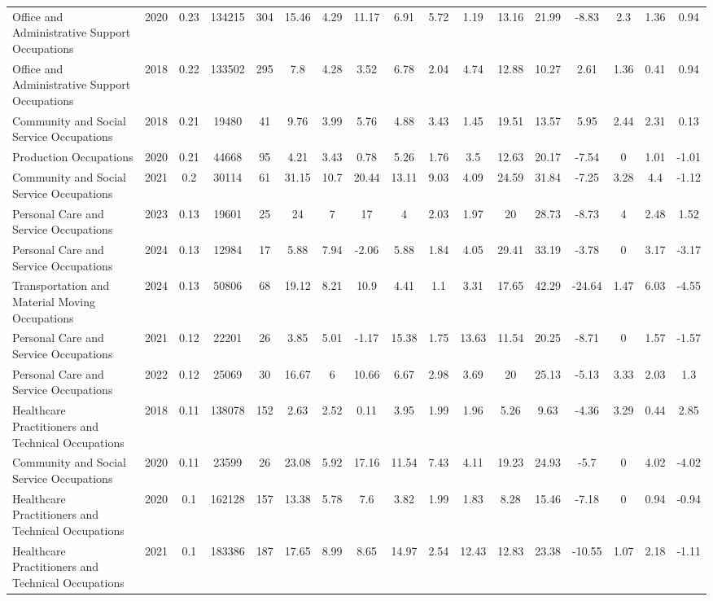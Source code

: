 \begin{landscape}
\begin{table}[htbp]
\begin{tabular}{lcccccccccccccccc}
Office and Administrative Support Occupations & 2020 & 0.23 & 134215 & 304 & 15.46 & 4.29 & 11.17 & 6.91 & 5.72 & 1.19 & 13.16 & 21.99 & -8.83 & 2.3 & 1.36 & 0.94 \\
Office and Administrative Support Occupations & 2018 & 0.22 & 133502 & 295 & 7.8 & 4.28 & 3.52 & 6.78 & 2.04 & 4.74 & 12.88 & 10.27 & 2.61 & 1.36 & 0.41 & 0.94 \\
Community and Social Service Occupations & 2018 & 0.21 & 19480 & 41 & 9.76 & 3.99 & 5.76 & 4.88 & 3.43 & 1.45 & 19.51 & 13.57 & 5.95 & 2.44 & 2.31 & 0.13 \\
Production Occupations & 2020 & 0.21 & 44668 & 95 & 4.21 & 3.43 & 0.78 & 5.26 & 1.76 & 3.5 & 12.63 & 20.17 & -7.54 & 0 & 1.01 & -1.01 \\
Community and Social Service Occupations & 2021 & 0.2 & 30114 & 61 & 31.15 & 10.7 & 20.44 & 13.11 & 9.03 & 4.09 & 24.59 & 31.84 & -7.25 & 3.28 & 4.4 & -1.12 \\
Personal Care and Service Occupations & 2023 & 0.13 & 19601 & 25 & 24 & 7 & 17 & 4 & 2.03 & 1.97 & 20 & 28.73 & -8.73 & 4 & 2.48 & 1.52 \\
Personal Care and Service Occupations & 2024 & 0.13 & 12984 & 17 & 5.88 & 7.94 & -2.06 & 5.88 & 1.84 & 4.05 & 29.41 & 33.19 & -3.78 & 0 & 3.17 & -3.17 \\
Transportation and Material Moving Occupations & 2024 & 0.13 & 50806 & 68 & 19.12 & 8.21 & 10.9 & 4.41 & 1.1 & 3.31 & 17.65 & 42.29 & -24.64 & 1.47 & 6.03 & -4.55 \\
Personal Care and Service Occupations & 2021 & 0.12 & 22201 & 26 & 3.85 & 5.01 & -1.17 & 15.38 & 1.75 & 13.63 & 11.54 & 20.25 & -8.71 & 0 & 1.57 & -1.57 \\
Personal Care and Service Occupations & 2022 & 0.12 & 25069 & 30 & 16.67 & 6 & 10.66 & 6.67 & 2.98 & 3.69 & 20 & 25.13 & -5.13 & 3.33 & 2.03 & 1.3 \\
Healthcare Practitioners and Technical Occupations & 2018 & 0.11 & 138078 & 152 & 2.63 & 2.52 & 0.11 & 3.95 & 1.99 & 1.96 & 5.26 & 9.63 & -4.36 & 3.29 & 0.44 & 2.85 \\
Community and Social Service Occupations & 2020 & 0.11 & 23599 & 26 & 23.08 & 5.92 & 17.16 & 11.54 & 7.43 & 4.11 & 19.23 & 24.93 & -5.7 & 0 & 4.02 & -4.02 \\
Healthcare Practitioners and Technical Occupations & 2020 & 0.1 & 162128 & 157 & 13.38 & 5.78 & 7.6 & 3.82 & 1.99 & 1.83 & 8.28 & 15.46 & -7.18 & 0 & 0.94 & -0.94 \\
Healthcare Practitioners and Technical Occupations & 2021 & 0.1 & 183386 & 187 & 17.65 & 8.99 & 8.65 & 14.97 & 2.54 & 12.43 & 12.83 & 23.38 & -10.55 & 1.07 & 2.18 & -1.11 \\

\end{tabular}
\end{table}
\end{landscape}
